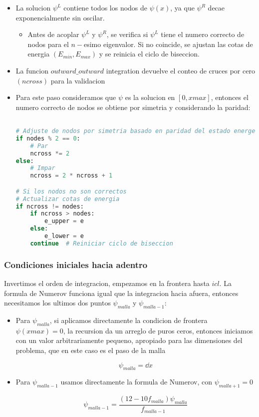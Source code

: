 \documentclass[11pt]{article}
\begin{document}
\begin{itemize}
\item La solucion \(\psi^L\) contiene todos los nodos de \(\psi(x)\), ya que \(\psi^R\) decae exponencialmente sin oscilar.

\begin{itemize}
\item Antes de acoplar \(\psi^L\) y \(\psi^R\), se verifica si \(\psi^L\) tiene el numero correcto de nodos para el \(n-\)esimo eigenvalor. Si no coincide, se ajustan las cotas de energia \((E_{min}, E_{max})\) y se reinicia el ciclo de biseccion.
\end{itemize}

\item La funcion \(outward\_ outward\) integration devuelve el conteo de cruces por cero \((ncross)\) para la validacion

\item Para este paso consideramos que \(\psi\) es la solucion en \([0,xmax]\), entonces el numero correcto de nodos se obtiene por simetria y considerando la paridad:

\begin{lstlisting}[language=Python,numbers=none]

# Adjuste de nodos por simetria basado en paridad del estado energetico
if nodes % 2 == 0:
    # Par
    ncross *= 2
else:
    # Impar
    ncross = 2 * ncross + 1

# Si los nodos no son correctos
# Actualizar cotas de energia
if ncross != nodes:
    if ncross > nodes:
        e_upper = e
    else:
        e_lower = e
    continue  # Reiniciar ciclo de biseccion

\end{lstlisting}
\end{itemize}
\subsubsection{Condiciones iniciales hacia adentro}
\label{sec:orgdede203}

Invertimos el orden de integracion, empezamos en la frontera hasta \(icl\). La formula de Numerov funciona igual que la integracion hacia afuera, entonces necesitamos los ultimos dos puntos \(\psi_{malla}\) y \(\psi_{malla-1}\):

\begin{itemize}
\item Para \(\psi_{malla}\), si aplicamos directamente la condicion de frontera \(\psi(xmax) = 0\), la recursion da un arreglo de puros ceros, entonces iniciamos con un valor arbitrariamente pequeno, apropiado para las dimensiones del problema, que en este caso es el paso de la malla

\[ \psi_{malla} = \dd{x} \]

\item Para \(\psi_{malla-1}\) usamos directamente la formula de Numerov, con \(\psi_{malla + 1} = 0\)

\[ \psi_{malla-1} = \frac{(12-10f_{malla})\psi_{malla}}{f_{malla-1}} \]
\end{itemize}
\end{document}
